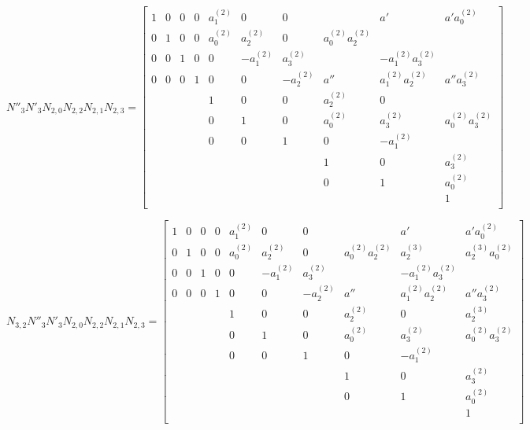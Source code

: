 \documentclass{article}
\begin{document}
\[
N''_3N'_3N_{2,0}N_{2,2}N_{2,1}N_{2,3}=
  \begin{bmatrix}
    1 & 0 & 0 & 0 & a_1^{(2)} & 0 & 0 &  & a' & a'a_0^{(2)} \\
    0 & 1 & 0 & 0 & a_0^{(2)} & a_2^{(2)} & 0 & a_0^{(2)}a_2^{(2)} &  &  \\
    0 & 0 & 1 & 0 & 0 & -a_1^{(2)} & a_3^{(2)} &  & -a_1^{(2)}a_3^{(2)} &  \\
    0 & 0 & 0 & 1 & 0 & 0 & -a_2^{(2)} & a'' & a_1^{(2)}a_2^{(2)} & a''a_3^{(2)} \\
    & & & & 1 & 0 & 0 & a_2^{(2)} & 0 &  \\
    & & & & 0 & 1 & 0 & a_0^{(2)} & a_3^{(2)} & a_0^{(2)}a_3^{(2)}\\
    & & & & 0 & 0 & 1 & 0 & -a_1^{(2)} &  \\
    & & & & & & & 1 & 0 & a_3^{(2)} \\
    & & & & & & & 0 & 1 & a_0^{(2)} \\
    & & & & & & & & & 1 \\
  \end{bmatrix}
\]

\[
N_{3,2}N''_3N'_3N_{2,0}N_{2,2}N_{2,1}N_{2,3}=
  \begin{bmatrix}
    1 & 0 & 0 & 0 & a_1^{(2)} & 0 & 0 &  & a' & a'a_0^{(2)} \\
    0 & 1 & 0 & 0 & a_0^{(2)} & a_2^{(2)} & 0 & a_0^{(2)}a_2^{(2)} & a_2^{(3)} & a_2^{(3)}a_0^{(2)} \\
    0 & 0 & 1 & 0 & 0 & -a_1^{(2)} & a_3^{(2)} &  & -a_1^{(2)}a_3^{(2)} &  \\
    0 & 0 & 0 & 1 & 0 & 0 & -a_2^{(2)} & a'' & a_1^{(2)}a_2^{(2)} & a''a_3^{(2)} \\
    & & & & 1 & 0 & 0 & a_2^{(2)} & 0 & a_2^{(3)} \\
    & & & & 0 & 1 & 0 & a_0^{(2)} & a_3^{(2)} & a_0^{(2)}a_3^{(2)}\\
    & & & & 0 & 0 & 1 & 0 & -a_1^{(2)} &  \\
    & & & & & & & 1 & 0 & a_3^{(2)} \\
    & & & & & & & 0 & 1 & a_0^{(2)} \\
    & & & & & & & & & 1 \\
  \end{bmatrix}
\]
\end{document}
